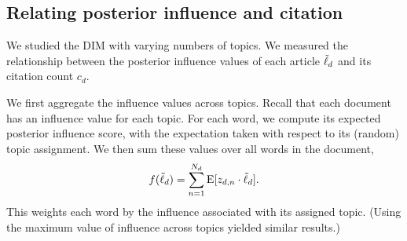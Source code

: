 \subsection*{Relating posterior influence and citation}
\label{sec:results}

We studied the DIM with varying numbers of topics.  We measured the
relationship between the posterior influence values of each article
$\tilde{\ell}_d$ and its citation count $c_d$.

We first aggregate the influence values across topics.  Recall that
each document has an influence value for each topic.  For each word,
we compute its expected posterior influence score, with the
expectation taken with respect to its (random) topic assignment.  We
then sum these values over all words in the document,
\begin{equation}
  f(\tilde{\ell}_d) = \sum_{n=1}^{N_d} \textrm{E}[z_{d,n} \cdot \tilde{\ell}_d].
  \label{eq:score}
\end{equation}
This weights each word by the influence associated with its assigned
topic.  (Using the maximum value of influence across topics yielded
similar results.)




